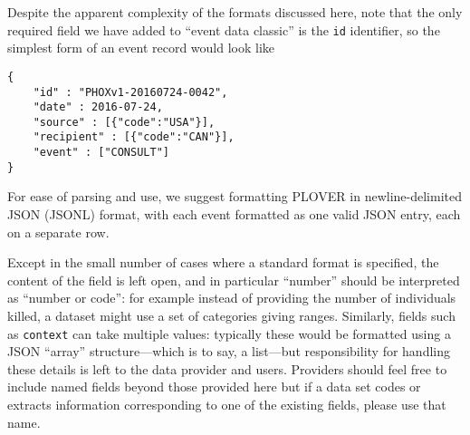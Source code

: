 \documentclass[11pt]{report}
\begin{document}
Despite the apparent complexity of the formats discussed here, note that the only required field we have added to ``event data classic'' is the \texttt{id} identifier, so the simplest form of an event record would look like
\begin{verbatim}
{
	"id" : "PHOXv1-20160724-0042",
	"date" : 2016-07-24,
	"source" : [{"code":"USA"}],
	"recipient" : [{"code":"CAN"}],
	"event" : ["CONSULT"]
}
\end{verbatim}

\noindent For ease of parsing and use, we suggest formatting PLOVER in newline-delimited JSON (JSONL) format, with each event formatted as one valid JSON entry, each on a separate row.

Except in the small number of cases where a standard format is specified, the content of the field is left open, and in particular ``number'' should be interpreted as ``number or code'': for example instead of providing the number of individuals killed, a dataset might use a set of categories giving ranges. Similarly, fields such as \texttt{context} can take multiple values: typically these would be formatted using a JSON ``array'' structure---which is to say, a list---but responsibility for handling these details is left to the data provider and users.  Providers should feel free to include named fields beyond those provided here but if a data set codes or extracts information  corresponding to one of the existing fields, please use that name.




\newpage 
\end{document}
